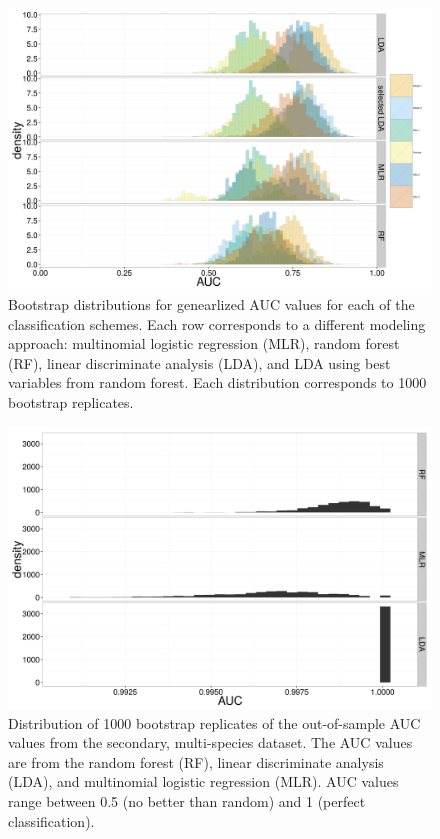 \documentclass[12pt,letterpaper]{article}
\begin{document}
\begin{figure}[ht]
  \centering
  \includegraphics[height = \textheight, width = \textwidth, keepaspectratio = true]{figure/gen_res}
  \caption{Bootstrap distributions for genearlized AUC values for each of the classification schemes. Each row corresponds to a different modeling approach: multinomial logistic regression (MLR), random forest (RF), linear discriminate analysis (LDA), and LDA using best variables from random forest. Each distribution corresponds to 1000 bootstrap replicates.}
  \label{fig:gen_hist}
\end{figure}

\begin{figure}[ht]
  \centering
  \includegraphics[height = \textheight, width = \textwidth, keepaspectratio = true]{figure/seven_boot}
  \caption{Distribution of 1000 bootstrap replicates of the out-of-sample AUC values from the secondary, multi-species dataset. The AUC values are from the random forest (RF), linear discriminate analysis (LDA), and multinomial logistic regression (MLR). AUC values range between 0.5 (no better than random) and 1 (perfect classification).}
  \label{fig:seven_boot}
\end{figure}
\end{document}

